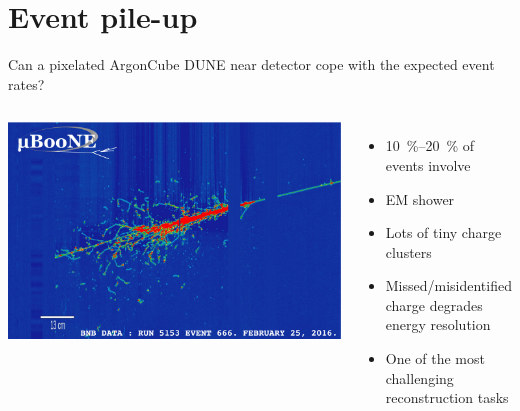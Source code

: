 \documentclass[]{beamer}
\newcommand*{\AC}{{ArgonCube}}
\newcommand*{\dune}{{DUNE}}
\begin{document}
\section{Event pile-up}

\begin{frame}{Can a pixelated \AC{} \dune{} near detector cope with the expected event rates?}
	\begin{columns}[c]
		\centering
		\includegraphics[width=\textwidth]{defence/uboone_em-shower}
		\begin{itemize}
			\item \SIrange{10}{20}{\percent} of events involve \Pgpz
			\item \HepProcess{\Pgpz \to \Pgg\Pgg} \textrightarrow{} EM shower
			\item Lots of tiny charge clusters
			\item Missed/misidentified charge degrades energy resolution
			\item One of the most challenging reconstruction tasks
		\end{itemize}
	\end{columns}
\end{frame}
\end{document}
